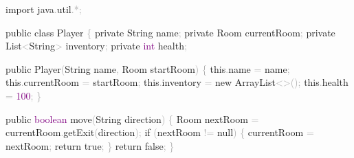 \documentclass[
  justified,
  openright,
]{tufte-book}
\newcommand{\BuiltInTok}[1]{#1}
\newcommand{\ControlFlowTok}[1]{\textcolor{BrandBlue}{#1}}
\newcommand{\DataTypeTok}[1]{\textcolor{Purple}{#1}}
\newcommand{\DecValTok}[1]{\textcolor{Purple}{#1}}
\newcommand{\FunctionTok}[1]{\textcolor{BrandBlue}{#1}}
\newcommand{\ImportTok}[1]{\textcolor{BrandAccent}{#1}}
\newcommand{\KeywordTok}[1]{\textcolor{BrandBlue}{#1}}
\newcommand{\NormalTok}[1]{#1}
\newcommand{\OperatorTok}[1]{\textcolor{DarkGray}{#1}}
\newenvironment{Shaded}{%
  \begin{snugshade}
}{%
  \end{snugshade}
}
\begin{document}
\begin{Shaded}
\begin{Highlighting}[]
\KeywordTok{import} \ImportTok{java}\OperatorTok{.}\ImportTok{util}\OperatorTok{.*;}

\KeywordTok{public} \KeywordTok{class}\NormalTok{ Player }\OperatorTok{\{}
    \KeywordTok{private} \BuiltInTok{String}\NormalTok{ name}\OperatorTok{;}
    \KeywordTok{private}\NormalTok{ Room currentRoom}\OperatorTok{;}
    \KeywordTok{private} \BuiltInTok{List}\OperatorTok{\textless{}}\BuiltInTok{String}\OperatorTok{\textgreater{}}\NormalTok{ inventory}\OperatorTok{;}
    \KeywordTok{private} \DataTypeTok{int}\NormalTok{ health}\OperatorTok{;}

    \KeywordTok{public} \FunctionTok{Player}\OperatorTok{(}\BuiltInTok{String}\NormalTok{ name}\OperatorTok{,}\NormalTok{ Room startRoom}\OperatorTok{)} \OperatorTok{\{}
        \KeywordTok{this}\OperatorTok{.}\FunctionTok{name} \OperatorTok{=}\NormalTok{ name}\OperatorTok{;}
        \KeywordTok{this}\OperatorTok{.}\FunctionTok{currentRoom} \OperatorTok{=}\NormalTok{ startRoom}\OperatorTok{;}
        \KeywordTok{this}\OperatorTok{.}\FunctionTok{inventory} \OperatorTok{=} \KeywordTok{new} \BuiltInTok{ArrayList}\OperatorTok{\textless{}\textgreater{}();}
        \KeywordTok{this}\OperatorTok{.}\FunctionTok{health} \OperatorTok{=} \DecValTok{100}\OperatorTok{;}
    \OperatorTok{\}}

    \KeywordTok{public} \DataTypeTok{boolean} \FunctionTok{move}\OperatorTok{(}\BuiltInTok{String}\NormalTok{ direction}\OperatorTok{)} \OperatorTok{\{}
\NormalTok{        Room nextRoom }\OperatorTok{=}\NormalTok{ currentRoom}\OperatorTok{.}\FunctionTok{getExit}\OperatorTok{(}\NormalTok{direction}\OperatorTok{);}
        \ControlFlowTok{if} \OperatorTok{(}\NormalTok{nextRoom }\OperatorTok{!=} \KeywordTok{null}\OperatorTok{)} \OperatorTok{\{}
\NormalTok{            currentRoom }\OperatorTok{=}\NormalTok{ nextRoom}\OperatorTok{;}
            \ControlFlowTok{return} \KeywordTok{true}\OperatorTok{;}
        \OperatorTok{\}}
        \ControlFlowTok{return} \KeywordTok{false}\OperatorTok{;}
    \OperatorTok{\}}


\end{Highlighting}
\end{Shaded}
\end{document}
